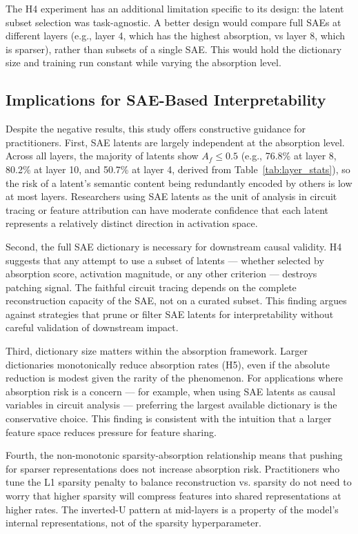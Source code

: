 \documentclass{article}
\begin{document}
The H4 experiment has an additional limitation specific to its design: the latent subset selection was task-agnostic. A better design would compare full SAEs at different layers (e.g., layer 4, which has the highest absorption, vs layer 8, which is sparser), rather than subsets of a single SAE. This would hold the dictionary size and training run constant while varying the absorption level.

\subsection{Implications for SAE-Based Interpretability}

Despite the negative results, this study offers constructive guidance for practitioners. First, SAE latents are largely independent at the absorption level. Across all layers, the majority of latents show $A_f \leq 0.5$ (e.g., 76.8\% at layer 8, 80.2\% at layer 10, and 50.7\% at layer 4, derived from Table~\ref{tab:layer_stats}), so the risk of a latent's semantic content being redundantly encoded by others is low at most layers. Researchers using SAE latents as the unit of analysis in circuit tracing or feature attribution can have moderate confidence that each latent represents a relatively distinct direction in activation space.

Second, the full SAE dictionary is necessary for downstream causal validity. H4 suggests that any attempt to use a subset of latents --- whether selected by absorption score, activation magnitude, or any other criterion --- destroys patching signal. The faithful circuit tracing depends on the complete reconstruction capacity of the SAE, not on a curated subset. This finding argues against strategies that prune or filter SAE latents for interpretability without careful validation of downstream impact.

Third, dictionary size matters within the absorption framework. Larger dictionaries monotonically reduce absorption rates (H5), even if the absolute reduction is modest given the rarity of the phenomenon. For applications where absorption risk is a concern --- for example, when using SAE latents as causal variables in circuit analysis --- preferring the largest available dictionary is the conservative choice. This finding is consistent with the intuition that a larger feature space reduces pressure for feature sharing.

Fourth, the non-monotonic sparsity-absorption relationship means that pushing for sparser representations does not increase absorption risk. Practitioners who tune the L1 sparsity penalty to balance reconstruction vs. sparsity do not need to worry that higher sparsity will compress features into shared representations at higher rates. The inverted-U pattern at mid-layers is a property of the model's internal representations, not of the sparsity hyperparameter.
\end{document}
